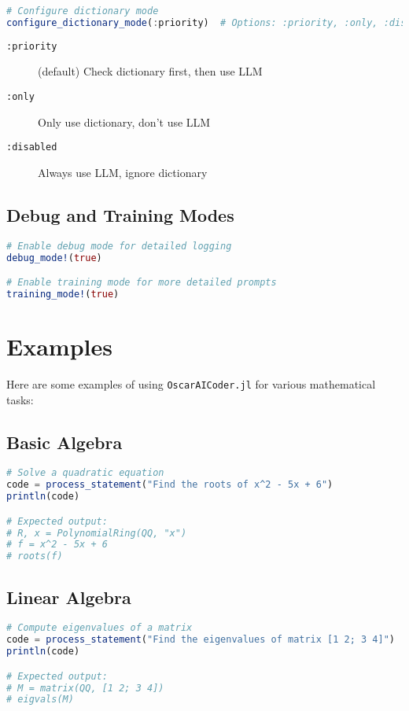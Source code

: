 \documentclass[11pt,a4paper]{article}
\newcommand{\code}[1]{\texttt{#1}}
\newcommand{\modname}[1]{\texttt{#1}}
\providecommand{\code}[1]{\texttt{\color{blue!70!black}#1}}
\begin{document}
\begin{lstlisting}[language=Julia]
# Configure dictionary mode
configure_dictionary_mode(:priority)  # Options: :priority, :only, :disabled
\end{lstlisting}

\begin{description}
    \item[\code{:priority}] (default) Check dictionary first, then use LLM
    \item[\code{:only}] Only use dictionary, don't use LLM
    \item[\code{:disabled}] Always use LLM, ignore dictionary
\end{description}

\subsection{Debug and Training Modes}

\begin{lstlisting}[language=Julia]
# Enable debug mode for detailed logging
debug_mode!(true)

# Enable training mode for more detailed prompts
training_mode!(true)
\end{lstlisting}

\section{Examples}
\label{sec:examples}

Here are some examples of using \modname{OscarAICoder.jl} for various mathematical tasks:

\subsection{Basic Algebra}

\begin{lstlisting}[language=Julia]
# Solve a quadratic equation
code = process_statement("Find the roots of x^2 - 5x + 6")
println(code)

# Expected output:
# R, x = PolynomialRing(QQ, "x")
# f = x^2 - 5x + 6
# roots(f)
\end{lstlisting}

\subsection{Linear Algebra}

\begin{lstlisting}[language=Julia]
# Compute eigenvalues of a matrix
code = process_statement("Find the eigenvalues of matrix [1 2; 3 4]")
println(code)

# Expected output:
# M = matrix(QQ, [1 2; 3 4])
# eigvals(M)
\end{lstlisting}
\end{document}
